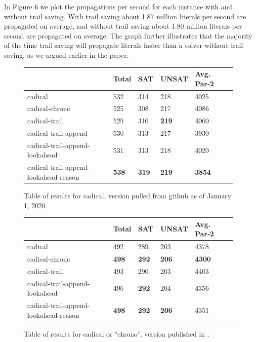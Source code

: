 \documentclass[runningheads]{llncs}
\begin{document}
In Figure 6 we plot the propagations per second for each instance with and without trail saving. With trail saving about 1.87 million literals per second are propagated on average, and without trail saving about 1.80 million literals per second are propagated on average. The graph further illustrates that the majority of the time trail saving will propagate literals faster than a solver without trail saving, as we argued earlier in the paper.

\begin{figure}
\centering
    \begin{tabular}{|l|l|l|l|l|l|}
      \hline
      & Total & SAT & UNSAT & Avg. Par-2 \\ \hline
      cadical                  & 532          & 314 &  218  & 4025                             \\ \hline
      cadical-chrono          & 525          & 308 &  217  & 4086                             \\ \hline
      cadical-trail           & 529          & 310 &  \textbf{219}  & 4060                   \\ \hline
      cadical-trail-append & 530 & 313 & 217 & 3930 \\ \hline
      cadical-trail-append-lookahead & 531          & 313 &  218  & 4020                      \\ \hline
      cadical-trail-append-lookahead-reason & \textbf{538} & \textbf{319} & \textbf{219} & \textbf{3854} \\ \hline
    \end{tabular}
    \caption{Table of results for cadical, version pulled from github as of January 1, 2020.}
\end{figure}

\begin{figure}
\centering
    \begin{tabular}{|l|l|l|l|l|l|}
      \hline
      & Total & SAT & UNSAT & Avg. Par-2 \\ \hline
      cadical                  & 492          & 289 &  203  & 4378                            \\ \hline
      cadical-chrono   & \textbf{498}  & \textbf{292} &  \textbf{206}  & \textbf{4300}      \\ \hline
      cadical-trail           & 493          & 290 &  203  & 4403                            \\ \hline
      cadical-trail-append-lookahead & 496  & \textbf{292} &  204  & 4356                    \\ \hline
      cadical-trail-append-lookahead-reason & \textbf{498} & \textbf{292} & \textbf{206} & 4351 \\ \hline
    \end{tabular}
    \caption{Table of results for cadical or "chrono", version published in \cite{DBLP:conf/sat/MohleB19}.}
\end{figure}
\end{document}
